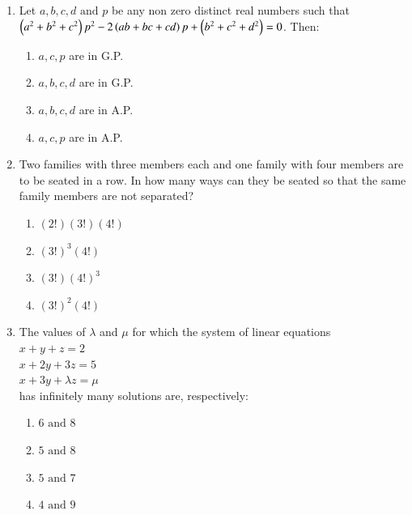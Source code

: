 \documentclass[journal]{IEEEtran}
\theoremstyle{remark}
\begin{document}
\begin{enumerate}
\item  Let $a, b, c, d \text{ and } p$ be any non zero distinct real numbers such that $\left(a^2+b^2+c^2\right)p^2-2\left(ab+bc+cd\right)p +\left(b^2 +c^2+d^2\right) = 0$. Then:



\begin{multicols}{2}
\begin{enumerate}
\item $a, c, p$ are in G.P.
\item $a, b, c, d$ are in G.P.
\item $ a, b, c, d$ are in A.P.
\item $a, c, p$ are in A.P.
\end{enumerate}
\end{multicols}

\item  Two families with three members each and one family with four members are to be seated in a row. In how many ways can they be seated so that the same family members are not separated?

\begin{multicols}{4}
\begin{enumerate}
\item $(2!) (3!) (4!)$
\item $(3!)^3 (4!)$
\item $ (3!)(4!)^3$
\item $(3!)^2 (4!)$
\end{enumerate}
\end{multicols}

\item  The values of $\lambda$ and $\mu$ for which the system of linear equations\\
$x+y+z = 2$\\
$x+2y+3z = 5$\\
$x+3y+\lambda z = \mu$\\
has infinitely many solutions are, respectively:

\begin{multicols}{4}
\begin{enumerate}
\item $6 \text{ and } 8$
\item $5 \text{ and } 8$
\item $5 \text{ and } 7$
\item $4 \text{ and } 9$
\end{enumerate}
\end{multicols}


\end{enumerate}
\end{document}
